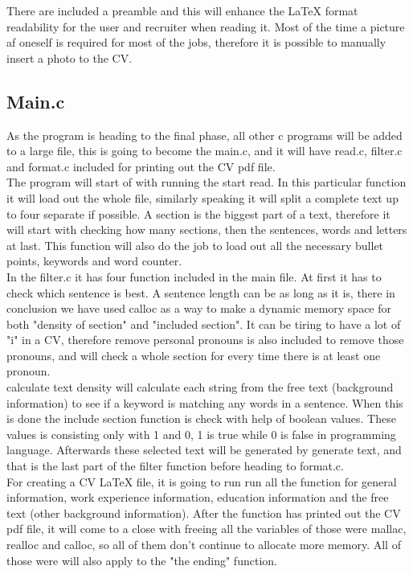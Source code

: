 There are included a preamble and this will enhance the LaTeX format readability for the user and recruiter when reading it. 
Most of the time a picture af oneself is required for most of the jobs, therefore it is possible to manually insert a photo to the CV. 

\subsection{Main.c}
As the program is heading to the final phase, all other c programs will be added to a large file, 
this is going to become the main.c, and it will have read.c, filter.c and format.c included for printing out the CV pdf file. \\

The program will start of with running the start read. In this particular function it will load out the whole file, 
similarly speaking it will split a complete text up to four separate if possible. A section is the biggest part of a text, 
therefore it will start with checking how many sections, then the sentences, words and letters at last.
This function will also do the job to load out all the necessary bullet points, keywords and word counter. \\

In the filter.c it has four function included in the main file.
At first it has to check which sentence is best. A sentence length can be as long as it is, 
there in conclusion we have used calloc as a way to make a dynamic memory space for both "density of section" and "included section".
It can be tiring to have a lot of "i" in a CV, therefore remove personal pronouns is also included to remove those pronouns,
and will check a whole section for every time there is at least one pronoun. \\

calculate text density will calculate each string from the free text (background information) to see
if a keyword is matching any words in a sentence.
When this is done the include section function is check with help of boolean values.
These values is consisting only with 1 and 0, 1 is true while 0 is false in programming language.
Afterwards these selected text will be generated by generate text, 
and that is the last part of the filter function before heading to format.c. \\

For creating a CV LaTeX file, it is going to run run all the function for general information, work experience information, 
education information and the free text (other background information). After the function has printed out the CV pdf file,
it will come to a close with freeing all the variables of those were mallac, realloc and calloc, 
so all of them don't continue to allocate more memory. All of those were will also apply to the "the ending" function.


